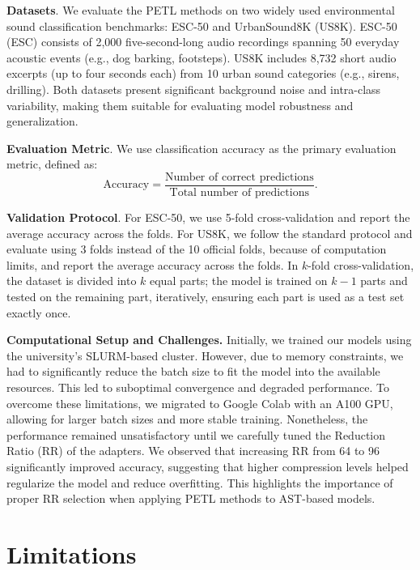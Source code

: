 \documentclass[11pt]{article}
\begin{document}
\textbf{Datasets}. We evaluate the PETL methods on two widely used environmental sound classification benchmarks: ESC-50 and UrbanSound8K (US8K). ESC-50 (ESC) \cite{piczak2015esc} consists of 2,000 five-second-long audio recordings spanning 50 everyday acoustic events (e.g., dog barking, footsteps). US8K \cite{salamon2014dataset} includes 8,732 short audio excerpts (up to four seconds each) from 10 urban sound categories (e.g., sirens, drilling). Both datasets present significant background noise and intra-class variability, making them suitable for evaluating model robustness and generalization.

\textbf{Evaluation Metric}. We use classification accuracy as the primary evaluation metric, defined as:
\begin{equation}
    \text{Accuracy} = \frac{\text{Number of correct predictions}}{\text{Total number of predictions}}.
\end{equation}

\textbf{Validation Protocol}. For ESC-50, we use 5-fold cross-validation and report the average accuracy across the folds. For US8K, we follow the standard protocol and evaluate using 3 folds instead of the 10 official folds, because of computation limits,  and report the average accuracy across the folds. In $k$-fold cross-validation, the dataset is divided into $k$ equal parts; the model is trained on $k-1$ parts and tested on the remaining part, iteratively, ensuring each part is used as a test set exactly once.



\textbf{Computational Setup and Challenges.} Initially, we trained our models using the university's SLURM-based cluster. However, due to memory constraints, we had to significantly reduce the batch size to fit the model into the available resources. This led to suboptimal convergence and degraded performance. To overcome these limitations, we migrated to Google Colab with an A100 GPU, allowing for larger batch sizes and more stable training. Nonetheless, the performance remained unsatisfactory until we carefully tuned the Reduction Ratio (RR) of the adapters. We observed that increasing RR from 64 to 96 significantly improved accuracy, suggesting that higher compression levels helped regularize the model and reduce overfitting. This highlights the importance of proper RR selection when applying PETL methods to AST-based models.



\section*{Limitations}
\end{document}

